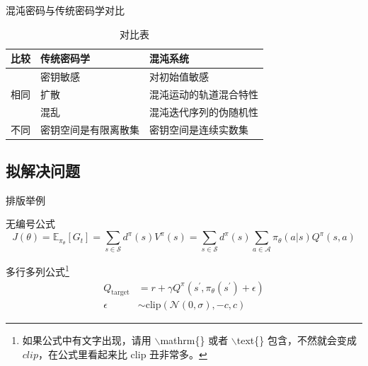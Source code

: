 \documentclass{beamer}
\begin{document}
\begin{frame}{混沌密码与传统密码学对比}
    \begin{table}[h]
        \centering
        \caption{对比表}
        \begin{tabular}{|l|l|l|}
        \hline
        比较                  & 传统密码学      & 混沌系统        \\ \hline
        \multirow{3}{*}{相同} & 密钥敏感       & 对初始值敏感      \\ \cline{2-3} 
                            & 扩散         & 混沌运动的轨道混合特性 \\ \cline{2-3} 
                            & 混乱         & 混沌迭代序列的伪随机性 \\ \hline
        不同                  & 密钥空间是有限离散集 & 密钥空间是连续实数集  \\ \hline
        \end{tabular}
    \end{table}
\end{frame}

\subsection{拟解决问题}

\begin{frame}{排版举例}
    \begin{exampleblock}{无编号公式} %
        \begin{equation*}
            J(\theta) = \mathbb{E}_{\pi_\theta}[G_t] = \sum_{s\in\mathcal{S}} d^\pi (s)V^\pi(s)=\sum_{s\in\mathcal{S}} d^\pi(s)\sum_{a\in\mathcal{A}}\pi_\theta(a|s)Q^\pi(s,a)
        \end{equation*}
    \end{exampleblock}
    \begin{exampleblock}{多行多列公式\footnote{如果公式中有文字出现，请用 $\backslash$mathrm\{\} 或者 $\backslash$text\{\} 包含，不然就会变成 $clip$，在公式里看起来比 $\mathrm{clip}$ 丑非常多。}}
        \begin{align}
            Q_\mathrm{target}&=r+\gamma Q^\pi(s^\prime, \pi_\theta(s^\prime)+\epsilon)\\
            \epsilon&\sim\mathrm{clip}(\mathcal{N}(0, \sigma), -c, c)\nonumber
        \end{align}
    \end{exampleblock}
\end{frame}
\end{document}
